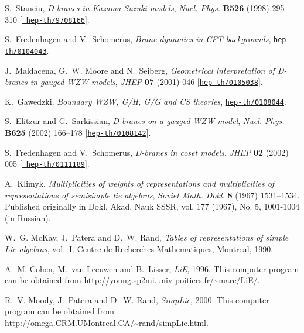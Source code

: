 \documentclass[12pt,a4paper]{article}
\begin{document}
\begin{thebibliography}{10}
S.~Stanciu, {\it D-branes in {Kazama-Suzuki} models},  {\em Nucl. Phys.} {\bf
  B526} (1998) 295--310 [\href{http://arXiv.org/abs/hep-th/9708166}{{\tt
  hep-th/9708166}}].

S.~Fredenhagen and V.~Schomerus, {\it Brane dynamics in {CFT} backgrounds},
  \href{http://arXiv.org/abs/hep-th/0104043}{{\tt hep-th/0104043}}.

J.~Maldacena, G.~W. Moore and N.~Seiberg, {\it Geometrical interpretation of
  {D-branes} in gauged {WZW} models},  {\em JHEP} {\bf 07} (2001) 046
  [\href{http://arXiv.org/abs/hep-th/0105038}{{\tt hep-th/0105038}}].

K.~Gawedzki, {\it Boundary {WZW}, {G/H}, {G/G} and {CS} theories},
  \href{http://arXiv.org/abs/hep-th/0108044}{{\tt hep-th/0108044}}.

S.~Elitzur and G.~Sarkissian, {\it D-branes on a gauged {WZW} model},  {\em
  Nucl. Phys.} {\bf B625} (2002) 166--178
  [\href{http://arXiv.org/abs/hep-th/0108142}{{\tt hep-th/0108142}}].

S.~Fredenhagen and V.~Schomerus, {\it D-branes in coset models},  {\em JHEP}
  {\bf 02} (2002) 005 [\href{http://arXiv.org/abs/hep-th/0111189}{{\tt
  hep-th/0111189}}].

A.~Klimyk, {\it Multiplicities of weights of representations and multiplicities
  of representations of semisimple lie algebras},  {\em Soviet Math. Dokl.}
  {\bf 8} (1967) 1531--1534. Published originally in Dokl. Akad. Nauk SSSR,
  vol. 177 (1967), No. 5, 1001-1004 (in Russian).

W.~G. McKay, J.~Patera and D.~W. Rand, {\em Tables of representations of simple
  {Lie} algebras}, vol.~I.
\newblock Centre de Recherches Mathematiques, Montreal, 1990.

A.~M. Cohen, M.~van Leeuwen and B.~Lisser, {\it {LiE}},  1996.
\newblock This computer program can be obtained from
  http://young.sp2mi.univ-poitiers.fr/\textasciitilde marc/LiE/.

R.~V. Moody, J.~Patera and D.~W. Rand, {\it {SimpLie}},  2000.
\newblock This computer program can be obtained from
  http://omega.CRM.UMontreal.CA/\textasciitilde rand/simpLie.html.


\end{thebibliography}
\end{document}
